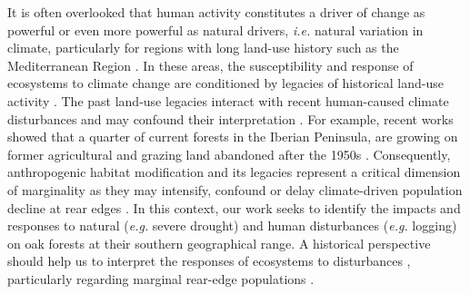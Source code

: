It is often overlooked that human activity constitutes a driver of change as powerful or even more powerful as natural drivers, \emph{i.e.} natural variation in climate, particularly for regions with long land-use history such as the Mediterranean Region \autocites[\emph{e.g.}][]{NavarroGonzalezetal2013WeightLanduse,DoblasMirandaetal2017ReviewCombination}. In these areas, the susceptibility and response of ecosystems to climate change are conditioned by legacies of historical land-use activity \autocites[\emph{e.g.}][]{Munteanuetal2015Legacies19th,Mausolfetal2018LegacyEffects}. The past land-use legacies interact with recent human-caused climate disturbances and may confound their interpretation \autocite{Fosteretal2003ImportanceLanduse}. For example, recent works showed that a quarter of current forests in the Iberian Peninsula, are growing on former agricultural and grazing land abandoned after the 1950s \autocite{VilaCabreraetal2017NewForests}. Consequently, anthropogenic habitat modification and its legacies represent a critical dimension of marginality as they may intensify, confound or delay climate-driven population decline at rear edges \autocite{VilaCabreraJump2019GreaterGrowth,SanchezdeDiosetal2020FagusSylvatica}. In this context, our work seeks to identify the impacts and responses to natural (\emph{e.g.} severe drought) and human disturbances (\emph{e.g.} logging) on oak forests at their southern geographical range. A historical perspective should help us to interpret the responses of ecosystems to disturbances \autocite{Fosteretal2003ImportanceLanduse}, particularly regarding marginal rear-edge populations \autocite{VilaCabreraetal2019RefiningPredictions}.

